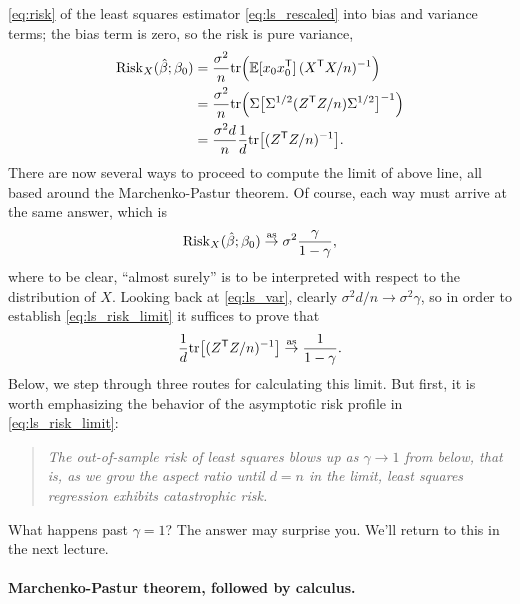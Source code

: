 \documentclass{article}
\begin{document}
\eqref{eq:risk} of the least squares estimator \eqref{eq:ls_rescaled} into bias
and variance terms; the bias term is zero, so the risk is pure variance,      
\begin{align}
\nonumber
\mathrm{Risk}_X(\hat{\beta}; \beta_0) 
&= \frac{\sigma^2}{n} \mathrm{tr}\Big(\mathbb{E} [x_0 x_0^{\mathsf{T}}] \, (X^{\mathsf{T}} X/n)^{-1} \Big) \\
\nonumber
&= \frac{\sigma^2}{n}\mathrm{tr}\Big(\Sigma \big[ \Sigma^{1/2} (Z^{\mathsf{T}} Z/n) \Sigma^{1/2} 
  \big]^{-1} \Big) \\ 
\label{eq:ls_var}
&= \frac{\sigma^2 d}{n} \frac{1}{d} \mathrm{tr} \big[ (Z^{\mathsf{T}} Z/n)^{-1} \big].
\end{align}
There are now several ways to proceed to compute the limit of above line, all
based around the Marchenko-Pastur theorem. Of course, each way must arrive at
the same answer, which is
\begin{equation}
\label{eq:ls_risk_limit}
\mathrm{Risk}_X(\hat{\beta}; \beta_0) \overset{\mathrm{as}}{\to} \sigma^2 \frac{\gamma}{1-\gamma},
\end{equation}
where to be clear, ``almost surely'' is to be interpreted with respect to the
distribution of $X$. Looking back at \eqref{eq:ls_var}, clearly $\sigma^2 d/n
\to \sigma^2 \gamma$, so in order to establish \eqref{eq:ls_risk_limit} it
suffices to prove that   
\begin{equation}
\label{eq:ls_var_limit}
\frac{1}{d} \mathrm{tr} \big[ (Z^{\mathsf{T}} Z/n)^{-1} \big] \overset{\mathrm{as}}{\to} \frac{1}{1-\gamma}.
\end{equation}
Below, we step through three routes for calculating this limit. But first, it is
worth emphasizing the behavior of the asymptotic risk profile in
\eqref{eq:ls_risk_limit}:  
\begin{quote}
\centering\it
The out-of-sample risk of least squares blows up as $\gamma \to 1$ from below,
that is, as we grow the aspect ratio until $d = n$ in the limit, least squares
regression exhibits catastrophic risk.  
\end{quote}
What happens past $\gamma = 1$? The answer may surprise you. We'll return to
this in the next lecture.  

\paragraph{Marchenko-Pastur theorem, followed by calculus.}  
\end{document}

